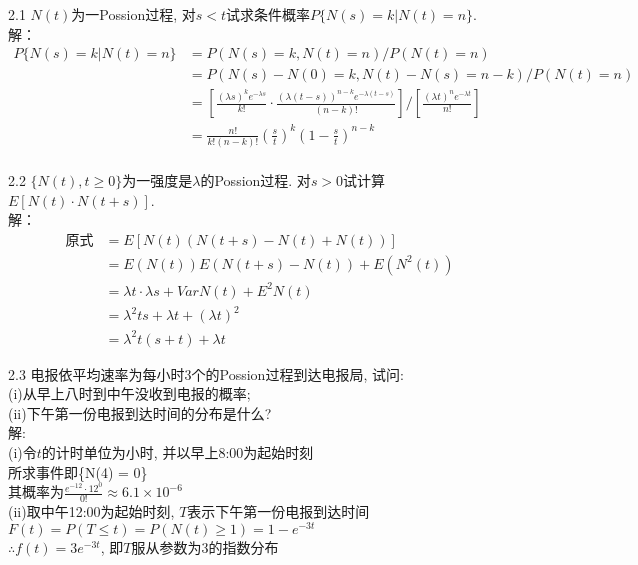 

2.1 $N(t)$为一Possion过程, 对$s < t$试求条件概率$P\{N(s) = k | N(t) = n\}$.\\
	解：
	\begin{align*}
	P\{N(s)=k|N(t)=n\} & = P(N(s)=k, N(t)=n) / P(N(t)=n)\\
						& = P(N(s)-N(0)=k, N(t)-N(s)=n-k) / P(N(t)=n)\\ 
						& = \left[\frac{({\lambda s})^ke^{-{\lambda s}}}{k!} \cdot \frac{\left(\lambda(t-s)\right)^{n-k} e^{-\lambda(t-s)}}{(n-k)!}\right] \Bigg/ \left[\frac{(\lambda t)^n e^{-\lambda t}}{n!}\right]\\
						& = \frac{n!}{k!(n-k)!}\left(\frac{s}{t}\right)^k \left(1-\frac{s}{t}\right)^{n-k}\\
	\end{align*}

2.2 $\{N(t), t \geqslant 0\}$为一强度是$\lambda$的Possion过程. 对$s > 0$试计算$E[N(t) \cdot N(t+s)]$. \\
	解：
	\[
	\begin{aligned}
	\text{原式} & = E\left[N(t)\left(N(t+s)-N(t)+N(t)\right)\right]\\
		& = E\left(N(t)\right)E\left(N(t+s)-N(t)\right)+E\left(N^2(t)\right)\\
		& = \lambda t \cdot \lambda s + VarN(t) + E^2N(t)\\
		& = {\lambda}^2ts+\lambda t + (\lambda t)^2\\
		& = {\lambda}^2t(s+t)+\lambda t
	\end{aligned}
	\]

2.3 电报依平均速率为每小时3个的Possion过程到达电报局, 试问:\\
	(i)从早上八时到中午没收到电报的概率;\\
	(ii)下午第一份电报到达时间的分布是什么?\\
	解:\\
	(i)令$t$的计时单位为小时, 并以早上8:00为起始时刻\\
		所求事件即\{N(4) = 0\}\\
		其概率为$\frac{e^{-12} \cdot 12^0}{0!} \approx 6.1 \times 10^{-6}$\\
	(ii)取中午12:00为起始时刻, $T$表示下午第一份电报到达时间
		$F(t) = P(T \leqslant t) = P\left(N(t) \geqslant 1\right) = 1 - e^{-3t}$\\
		$\therefore f(t) = 3e^{-3t}$, 即$T$服从参数为3的指数分布\\

